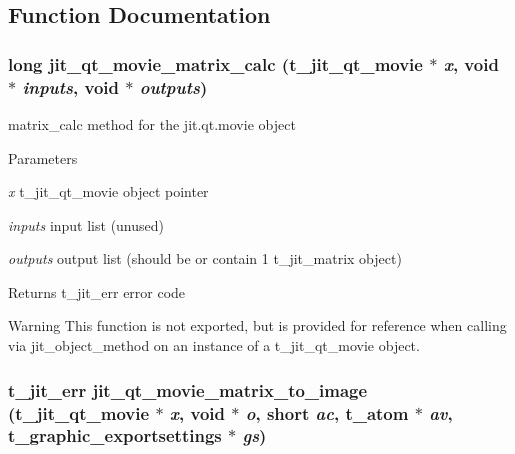\subsection{Function Documentation}
\hypertarget{group__qtmoviemod_ga422c5a6770e1cc1886785a494348d84a}{
\subsubsection[{jit\_\-qt\_\-movie\_\-matrix\_\-calc}]{\setlength{\rightskip}{0pt plus 5cm}long jit\_\-qt\_\-movie\_\-matrix\_\-calc (t\_\-jit\_\-qt\_\-movie $\ast$ {\em x}, \/  void $\ast$ {\em inputs}, \/  void $\ast$ {\em outputs})}}
\label{group__qtmoviemod_ga422c5a6770e1cc1886785a494348d84a}


matrix\_\-calc method for the jit.qt.movie object 
\begin{DoxyParams}{Parameters}
\item[{\em x}]t\_\-jit\_\-qt\_\-movie object pointer \item[{\em inputs}]input list (unused) \item[{\em outputs}]output list (should be or contain 1 t\_\-jit\_\-matrix object)\end{DoxyParams}
\begin{DoxyReturn}{Returns}
t\_\-jit\_\-err error code
\end{DoxyReturn}
\begin{DoxyWarning}{Warning}
This function is not exported, but is provided for reference when calling via jit\_\-object\_\-method on an instance of a t\_\-jit\_\-qt\_\-movie object. 
\end{DoxyWarning}
\hypertarget{group__qtmoviemod_ga8ce71c8eacec87a89ce1bc964de16a7a}{
\subsubsection[{jit\_\-qt\_\-movie\_\-matrix\_\-to\_\-image}]{\setlength{\rightskip}{0pt plus 5cm}t\_\-jit\_\-err jit\_\-qt\_\-movie\_\-matrix\_\-to\_\-image (t\_\-jit\_\-qt\_\-movie $\ast$ {\em x}, \/  void $\ast$ {\em o}, \/  short {\em ac}, \/  {\bf t\_\-atom} $\ast$ {\em av}, \/  t\_\-graphic\_\-exportsettings $\ast$ {\em gs})}}
\label{group__qtmoviemod_ga8ce71c8eacec87a89ce1bc964de16a7a}


